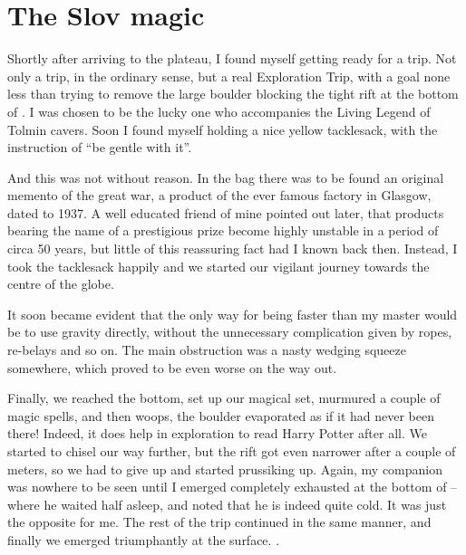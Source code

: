 \section{The Slov magic}


Shortly after arriving to the plateau, I found myself getting ready for
a trip. Not only a trip, in the ordinary sense, but a real Exploration
Trip, with a goal none less than trying to remove the large boulder
blocking the tight rift at the bottom of . I was chosen to be
the lucky one who accompanies the Living Legend of Tolmin cavers. Soon I
found myself holding a nice yellow tacklesack, with the instruction of
``be gentle with it''.

And this was not without reason. In the bag there was to be found an
original memento of the great war, a product of the ever famous factory
in Glasgow, dated to 1937. A well educated friend of mine pointed out
later, that products bearing the name of a prestigious prize become
highly unstable in a period of circa 50 years, but little of this
reassuring fact had I known back then. Instead, I took the tacklesack
happily and we started our vigilant journey towards the centre of the
globe.


It soon became evident that the only way for being faster than my master
would be to use gravity directly, without the unnecessary complication
given by ropes, re-belays and so on. The main obstruction was a nasty
wedging squeeze somewhere, which proved to be even worse on the way out.

Finally, we reached the bottom, set up our magical set, murmured a
couple of magic spells, and then woops, the boulder evaporated as if it
had never been there! Indeed, it does help in exploration to read Harry
Potter after all. We started to chisel our way further, but the rift got
even narrower after a couple of meters, so we had to give up and started
prussiking up. Again, my companion was nowhere to be seen until I
emerged completely exhausted at the bottom of  -- where he
waited half asleep, and noted that he is indeed quite cold. It was just
the opposite for me. The rest of the trip continued in the same manner,
and finally we emerged triumphantly at the surface. .

